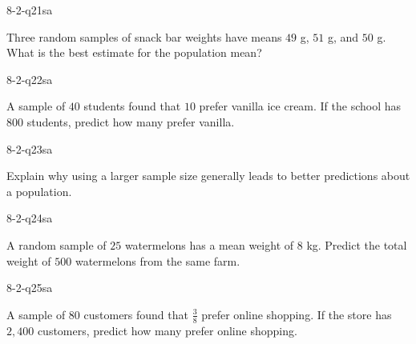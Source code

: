\begin{practiceQuestion}{8-2-q21}{sa}
\begin{questionText}
Three random samples of snack bar weights have means $49$ g, $51$ g, and $50$ g. What is the best estimate for the population mean?
\end{questionText}
\end{practiceQuestion}

\begin{practiceQuestion}{8-2-q22}{sa}
\begin{questionText}
A sample of $40$ students found that $10$ prefer vanilla ice cream. If the school has $800$ students, predict how many prefer vanilla.
\end{questionText}
\end{practiceQuestion}

\begin{practiceQuestion}{8-2-q23}{sa}
\begin{questionText}
Explain why using a larger sample size generally leads to better predictions about a population.
\end{questionText}
\end{practiceQuestion}

\begin{practiceQuestion}{8-2-q24}{sa}
\begin{questionText}
A random sample of $25$ watermelons has a mean weight of $8$ kg. Predict the total weight of $500$ watermelons from the same farm.
\end{questionText}
\end{practiceQuestion}

\begin{practiceQuestion}{8-2-q25}{sa}
\begin{questionText}
A sample of $80$ customers found that $\frac{3}{8}$ prefer online shopping. If the store has $2{,}400$ customers, predict how many prefer online shopping.
\end{questionText}
\end{practiceQuestion}

